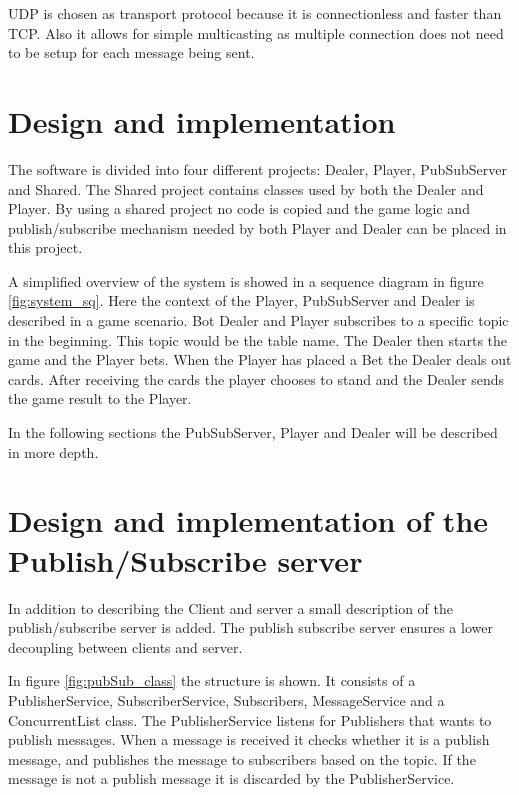 
UDP is chosen as transport protocol because it is connectionless and faster than TCP. Also it allows for simple multicasting as multiple connection does not need to be setup for each message being sent.

\section{Design and implementation}
The software is divided into four different projects: Dealer, Player, PubSubServer and Shared. The Shared project contains classes used by both the Dealer and Player. By using a shared project no code is copied and the game logic and publish/subscribe mechanism needed by both Player and Dealer can be placed in this project.

A simplified overview of the system is showed in a sequence diagram in figure \ref{fig:system_sq}. Here the context of the Player, PubSubServer and Dealer is described in a game scenario. Bot Dealer and Player subscribes to a specific topic in the beginning. This topic would be the table name. The Dealer then starts the game and the Player bets. When the Player has placed a Bet the Dealer deals out cards. After receiving the cards the player chooses to stand and the Dealer sends the game result to the Player. 

\FloatBarrier

In the following sections the PubSubServer, Player and Dealer will be described in more depth.

\section{Design and implementation of the Publish/Subscribe server}
In addition to describing the Client and server a small description of the publish/subscribe server is added. The publish subscribe server ensures a lower decoupling between clients and server.


In figure \ref{fig:pubSub_class} the structure is shown. It consists of a PublisherService, SubscriberService, Subscribers, MessageService and a ConcurrentList class. The PublisherService listens for Publishers that wants to publish messages. When a message is received it checks whether it is a publish message, and publishes the message to subscribers based on the topic. If the message is not a publish message it is discarded by the PublisherService.

